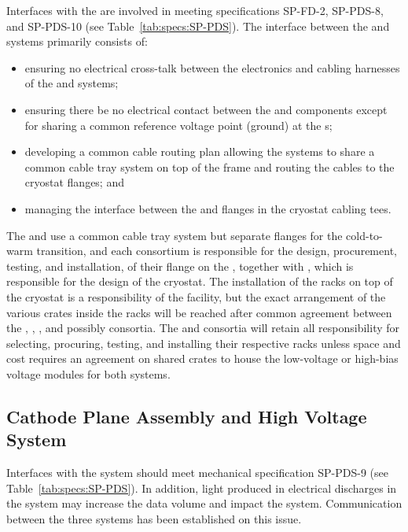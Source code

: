Interfaces with the   are involved in meeting specifications SP-FD-2, SP-PDS-8, and SP-PDS-10 (see Table~\ref{tab:specs:SP-PDS}).  The interface between the  and  systems primarily consists of:

\begin{itemize}
    
    \item ensuring no electrical cross-talk between the electronics and cabling harnesses of the  and  systems;
    \item ensuring there be no electrical contact between the  and  components except for sharing a common reference voltage point (ground) at the \fdth{}s;
    \item developing a common cable routing plan allowing the systems to share a common cable tray system on top of the  frame and routing the cables to the cryostat flanges; and 
    \item managing the interface between the  and  flanges in the cryostat cabling tees.
  \end{itemize}  
The  and  use a common cable tray system but separate flanges for the cold-to-warm transition, and each consortium is responsible for the design, procurement, testing, and installation, of their flange on the \fdth{}, together with , which is responsible for the design of the cryostat. 
The installation of the racks on top of the cryostat is a responsibility of the facility, but the exact arrangement of the various crates inside the racks will be reached after common agreement between the , , , and possibly  consortia. 
The  and  consortia will retain all responsibility for selecting, procuring, testing, and installing their respective racks unless space and cost requires an agreement on shared crates to house the low-voltage or high-bias voltage modules for both systems. 

\subsection{Cathode Plane Assembly and High Voltage System}
\label{sec:fdsp-pd-intfc-le}


Interfaces with the  system should meet mechanical specification SP-PDS-9 (see Table~\ref{tab:specs:SP-PDS}). In addition, light produced in electrical discharges in the  system may increase the  data volume and impact the  system. Communication between the three systems has been established on this issue. 

